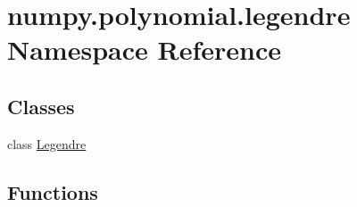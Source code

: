 \hypertarget{namespacenumpy_1_1polynomial_1_1legendre}{}\section{numpy.\+polynomial.\+legendre Namespace Reference}
\label{namespacenumpy_1_1polynomial_1_1legendre}
\subsection*{Classes}
\begin{DoxyCompactItemize}
\item 
class \hyperlink{classnumpy_1_1polynomial_1_1legendre_1_1Legendre}{Legendre}
\end{DoxyCompactItemize}
\subsection*{Functions}
